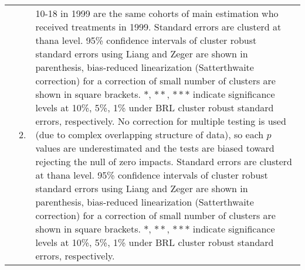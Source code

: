 \begin{table}
\begin{tabular}{>{\hfill\scriptsize}p{1cm}<{}>{\hfill\scriptsize}p{.5cm}<{}>{\scriptsize}p{12cm}<{\hfill}}
& 2. & \textsf{10-18 in 1999} are the same cohorts of main estimation who received treatments in 1999. Standard errors are clusterd at thana level. 95\% confidence intervals of cluster robust standard errors using Liang and Zeger are shown in parenthesis, bias-reduced linearization (Satterthwaite correction) for a correction of small number of clusters are shown in square brackets. $*$, $**$, $***$ indicate significance levels at 10\%, 5\%, 1\% under BRL cluster robust standard errors, respectively. No correction for multiple testing is used (due to complex overlapping structure of data), so each $p$ values are underestimated and the tests are biased toward rejecting the null of zero impacts. Standard errors are clusterd at thana level. 95\% confidence intervals of cluster robust standard errors using Liang and Zeger are shown in parenthesis, bias-reduced linearization (Satterthwaite correction) for a correction of small number of clusters are shown in square brackets. $*$, $**$, $***$ indicate significance levels at 10\%, 5\%, 1\% under BRL cluster robust standard errors, respectively.\end{tabular}
\end{table}

